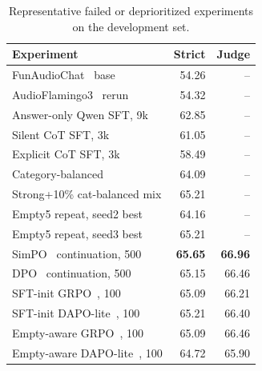 \begin{table}[t]
\centering
\small
\caption{Representative failed or deprioritized experiments on the development set.}
\label{tab:failed}
\begin{tabular}{lrr}
\toprule
Experiment & Strict & Judge \\
\midrule
FunAudioChat~\cite{funaudiochat2025,funaudiollm2024} base & 54.26 & -- \\
AudioFlamingo3~\cite{goel2025audioflamingo3} rerun & 54.32 & -- \\
Answer-only Qwen SFT, 9k & 62.85 & -- \\
Silent CoT SFT, 3k & 61.05 & -- \\
Explicit CoT SFT, 3k & 58.49 & -- \\
Category-balanced & 64.09 & -- \\
Strong+10\% cat-balanced mix & 65.21 & -- \\
Empty5 repeat, seed2 best & 64.16 & -- \\
Empty5 repeat, seed3 best & 65.21 & -- \\
SimPO~\cite{meng2024simpo} continuation, 500 & \textbf{65.65} & \textbf{66.96} \\
DPO~\cite{rafailov2023dpo} continuation, 500 & 65.15 & 66.46 \\
SFT-init GRPO~\cite{shao2024deepseekmath}, 100 & 65.09 & 66.21 \\
SFT-init DAPO-lite~\cite{yu2025dapo}, 100 & 65.21 & 66.40 \\
Empty-aware GRPO~\cite{shao2024deepseekmath}, 100 & 65.09 & 66.46 \\
Empty-aware DAPO-lite~\cite{yu2025dapo}, 100 & 64.72 & 65.90 \\
\bottomrule
\end{tabular}
\vspace{-15pt}
\end{table}